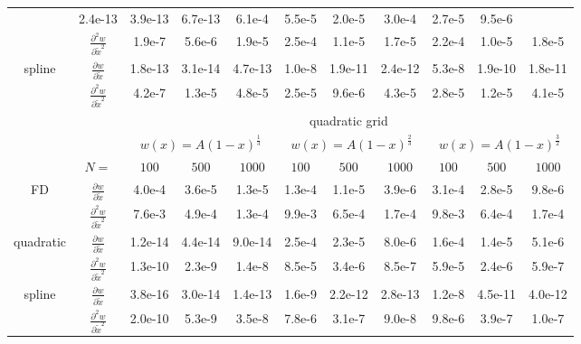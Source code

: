 \begin{tabular}{cc|c|c|c|c|c|c|c|c|c|}
  &2.4e-13  &3.9e-13  &6.7e-13  &6.1e-4  &5.5e-5  &2.0e-5  &3.0e-4  &2.7e-5  &9.5e-6
\\ \cline{2-11}
\multicolumn{1}{|c|}{}                        &
\multicolumn{1}{|c|}{$\frac{\partial^2 w}{\partial \tilde x^2}$}
  &1.9e-7  &5.6e-6  &1.9e-5  &2.5e-4  &1.1e-5  &1.7e-5  &2.2e-4  &1.0e-5  &1.8e-5
\\ \cline{1-11}
\multicolumn{1}{|c|}{\multirow{2}{*}{spline}} &
\multicolumn{1}{|c|}{$\frac{\partial w}{\partial \tilde x}$}
  &1.8e-13  &3.1e-14  &4.7e-13  &1.0e-8  &1.9e-11  &2.4e-12  &5.3e-8  &1.9e-10  &1.8e-11
\\ \cline{2-11}
\multicolumn{1}{|c|}{}                        &
\multicolumn{1}{|c|}{$\frac{\partial^2 w}{\partial \tilde x^2}$}
  &4.2e-7  &1.3e-5  &4.8e-5  &2.5e-5  &9.6e-6  &4.3e-5  &2.8e-5  &1.2e-5  &4.1e-5
\\ \cline{1-11}
& & \multicolumn{9}{|c|}{quadratic grid}
\\ \cline{3-11}
& & \multicolumn{3}{|c|}{$w(x)=A(1-x)^\frac{1}{3}$} &  \multicolumn{3}{|c|}{$w(x)=A(1-x)^\frac{2}{3}$} &  \multicolumn{3}{|c|}{$w(x)=A(1-x)^\frac{3}{2}$}
\\ \cline{2-11}
& \multicolumn{1}{|c|}{$N=$} & $100$ & $500$ & $1000$ & $100$ & $500$ & $1000$ & $100$ & $500$ & $1000$
\\ \cline{1-11}
\multicolumn{1}{|c|}{\multirow{2}{*}{FD}} &
\multicolumn{1}{|c|}{$\frac{\partial w}{\partial \tilde x}$}
  &4.0e-4  &3.6e-5  &1.3e-5  &1.3e-4  &1.1e-5  &3.9e-6  &3.1e-4  &2.8e-5  &9.8e-6
\\ \cline{2-11}
\multicolumn{1}{|c|}{}                        &
\multicolumn{1}{|c|}{$\frac{\partial^2 w}{\partial \tilde x^2}$}
  &7.6e-3  &4.9e-4  &1.3e-4  &9.9e-3  &6.5e-4  &1.7e-4  &9.8e-3  &6.4e-4  &1.7e-4
\\ \cline{1-11}
\multicolumn{1}{|c|}{\multirow{2}{*}{quadratic}} &
\multicolumn{1}{|c|}{$\frac{\partial w}{\partial \tilde x}$}
  &1.2e-14  &4.4e-14  &9.0e-14  &2.5e-4  &2.3e-5  &8.0e-6  &1.6e-4  &1.4e-5  &5.1e-6
\\ \cline{2-11}
\multicolumn{1}{|c|}{}                        &
\multicolumn{1}{|c|}{$\frac{\partial^2 w}{\partial \tilde x^2}$}
  &1.3e-10  &2.3e-9  &1.4e-8  &8.5e-5  &3.4e-6  &8.5e-7  &5.9e-5  &2.4e-6  &5.9e-7
\\ \cline{1-11}
\multicolumn{1}{|c|}{\multirow{2}{*}{spline}} &
\multicolumn{1}{|c|}{$\frac{\partial w}{\partial \tilde x}$}
  &3.8e-16  &3.0e-14  &1.4e-13  &1.6e-9  &2.2e-12  &2.8e-13  &1.2e-8  &4.5e-11  &4.0e-12
\\ \cline{2-11}
\multicolumn{1}{|c|}{}                        &
\multicolumn{1}{|c|}{$\frac{\partial^2 w}{\partial \tilde x^2}$}
  &2.0e-10  &5.3e-9  &3.5e-8  &7.8e-6  &3.1e-7  &9.0e-8  &9.8e-6  &3.9e-7  &1.0e-7
\\ \cline{1-11}
\end{tabular}
